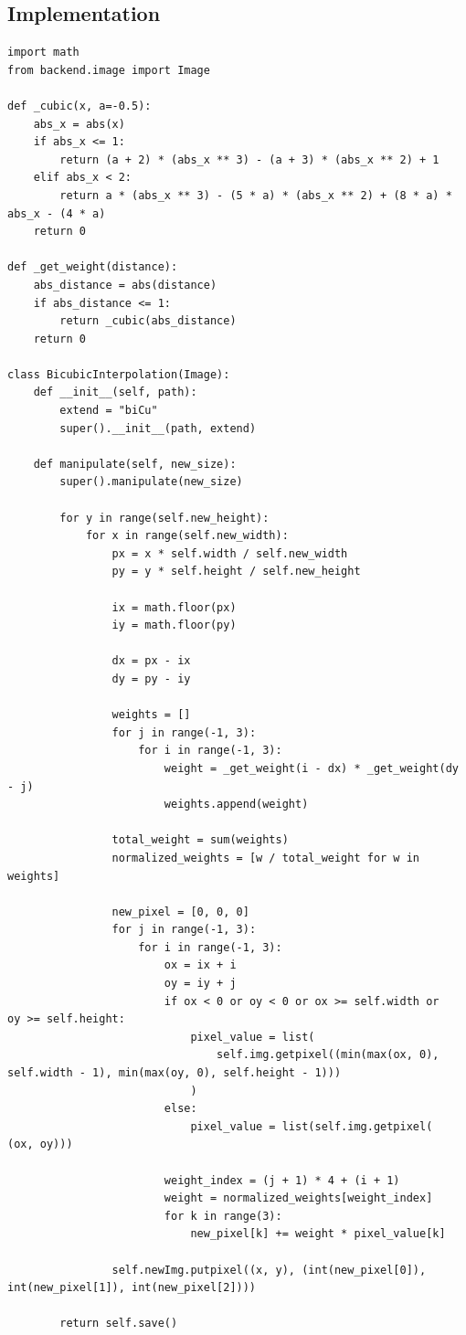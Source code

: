    \subsection{Implementation}
    \begin{lstlisting}
import math
from backend.image import Image

def _cubic(x, a=-0.5):
    abs_x = abs(x)
    if abs_x <= 1:
        return (a + 2) * (abs_x ** 3) - (a + 3) * (abs_x ** 2) + 1
    elif abs_x < 2:
        return a * (abs_x ** 3) - (5 * a) * (abs_x ** 2) + (8 * a) *
abs_x - (4 * a)
    return 0

def _get_weight(distance):
    abs_distance = abs(distance)
    if abs_distance <= 1:
        return _cubic(abs_distance)
    return 0

class BicubicInterpolation(Image):
    def __init__(self, path):
        extend = "biCu"
        super().__init__(path, extend)

    def manipulate(self, new_size):
        super().manipulate(new_size)

        for y in range(self.new_height):
            for x in range(self.new_width):
                px = x * self.width / self.new_width
                py = y * self.height / self.new_height

                ix = math.floor(px)
                iy = math.floor(py)

                dx = px - ix
                dy = py - iy

                weights = []
                for j in range(-1, 3):
                    for i in range(-1, 3):
                        weight = _get_weight(i - dx) * _get_weight(dy - j)
                        weights.append(weight)

                total_weight = sum(weights)
                normalized_weights = [w / total_weight for w in weights]

                new_pixel = [0, 0, 0]
                for j in range(-1, 3):
                    for i in range(-1, 3):
                        ox = ix + i
                        oy = iy + j
                        if ox < 0 or oy < 0 or ox >= self.width or
oy >= self.height:
                            pixel_value = list(
                                self.img.getpixel((min(max(ox, 0),
self.width - 1), min(max(oy, 0), self.height - 1)))
                            )
                        else:
                            pixel_value = list(self.img.getpixel(
(ox, oy)))

                        weight_index = (j + 1) * 4 + (i + 1)
                        weight = normalized_weights[weight_index]
                        for k in range(3):
                            new_pixel[k] += weight * pixel_value[k]

                self.newImg.putpixel((x, y), (int(new_pixel[0]),
int(new_pixel[1]), int(new_pixel[2])))

        return self.save()
    \end{lstlisting}


